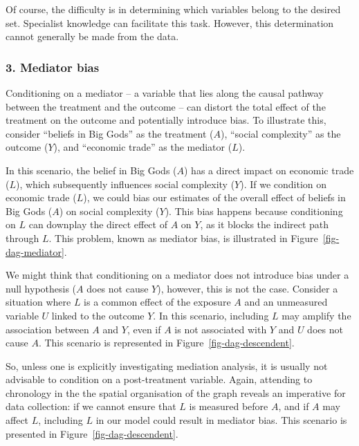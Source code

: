 \documentclass[
  singlecolumn]{article}
\begin{document}
Of course, the difficulty is in determining which variables belong to
the desired set. Specialist knowledge can facilitate this task. However,
this determination cannot generally be made from the data.

\hypertarget{mediator-bias}{%
\subsubsection{3. Mediator bias}\label{mediator-bias}}

Conditioning on a mediator -- a variable that lies along the causal
pathway between the treatment and the outcome -- can distort the total
effect of the treatment on the outcome and potentially introduce bias.
To illustrate this, consider ``beliefs in Big Gods'' as the treatment
(\(A\)), ``social complexity'' as the outcome (\(Y\)), and ``economic
trade'' as the mediator (\(L\)).

In this scenario, the belief in Big Gods (\(A\)) has a direct impact on
economic trade (\(L\)), which subsequently influences social complexity
(\(Y\)). If we condition on economic trade (\(L\)), we could bias our
estimates of the overall effect of beliefs in Big Gods (\(A\)) on social
complexity (\(Y\)). This bias happens because conditioning on \(L\) can
downplay the direct effect of \(A\) on \(Y\), as it blocks the indirect
path through \(L\). This problem, known as mediator bias, is illustrated
in Figure~\ref{fig-dag-mediator}.

We might think that conditioning on a mediator does not introduce bias
under a null hypothesis (\(A\) does not cause \(Y\)), however, this is
not the case. Consider a situation where \(L\) is a common effect of the
exposure \(A\) and an unmeasured variable \(U\) linked to the outcome
\(Y\). In this scenario, including \(L\) may amplify the association
between \(A\) and \(Y\), even if \(A\) is not associated with \(Y\) and
\(U\) does not cause \(A\). This scenario is represented in
Figure~\ref{fig-dag-descendent}.

So, unless one is explicitly investigating mediation analysis, it is
usually not advisable to condition on a post-treatment variable. Again,
attending to chronology in the the spatial organisation of the graph
reveals an imperative for data collection: if we cannot ensure that
\(L\) is measured before \(A\), and if \(A\) may affect \(L\), including
\(L\) in our model could result in mediator bias. This scenario is
presented in Figure~\ref{fig-dag-descendent}.
\end{document}
